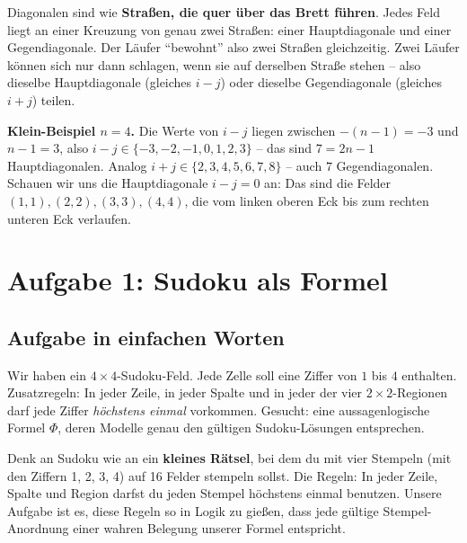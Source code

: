 \documentclass[a4paper,12pt]{article}
\begin{document}
\begin{analogie}
Diagonalen sind wie \textbf{Stra{\ss}en, die quer \"uber das Brett
f\"uhren}. Jedes Feld liegt an einer Kreuzung von genau zwei
Stra{\ss}en: einer Hauptdiagonale und einer Gegendiagonale. Der
L\"aufer "`bewohnt"' also zwei Stra{\ss}en gleichzeitig. Zwei L\"aufer
k\"onnen sich nur dann schlagen, wenn sie auf derselben Stra{\ss}e
stehen -- also dieselbe Hauptdiagonale (gleiches $i-j$) oder
dieselbe Gegendiagonale (gleiches $i+j$) teilen.
\end{analogie}

\textbf{Klein-Beispiel $n = 4$.} Die Werte von $i - j$ liegen
zwischen $-(n-1) = -3$ und $n-1 = 3$, also
$i - j \in \{-3, -2, -1, 0, 1, 2, 3\}$ -- das sind $7 = 2n-1$
Hauptdiagonalen. Analog $i + j \in \{2, 3, 4, 5, 6, 7, 8\}$ -- auch
$7$ Gegendiagonalen. Schauen wir uns die Hauptdiagonale $i - j = 0$
an: Das sind die Felder $(1,1), (2,2), (3,3), (4,4)$, die vom linken
oberen Eck bis zum rechten unteren Eck verlaufen.

\newpage


\section{Aufgabe 1: Sudoku als Formel}

\subsection*{Aufgabe in einfachen Worten}

Wir haben ein $4 \times 4$-Sudoku-Feld. Jede Zelle soll eine Ziffer
von $1$ bis $4$ enthalten. Zusatzregeln: In jeder Zeile, in jeder
Spalte und in jeder der vier $2 \times 2$-Regionen darf jede Ziffer
\emph{h\"ochstens einmal} vorkommen. Gesucht: eine aussagenlogische
Formel $\Phi$, deren Modelle genau den g\"ultigen Sudoku-L\"osungen
entsprechen.

\begin{analogie}
Denk an Sudoku wie an ein \textbf{kleines R\"atsel}, bei dem du mit
vier Stempeln (mit den Ziffern 1, 2, 3, 4) auf 16 Felder stempeln
sollst. Die Regeln: In jeder Zeile, Spalte und Region darfst du jeden
Stempel h\"ochstens einmal benutzen. Unsere Aufgabe ist es, diese
Regeln so in Logik zu gie{\ss}en, dass jede g\"ultige Stempel-Anordnung
einer wahren Belegung unserer Formel entspricht.
\end{analogie}
\end{document}
